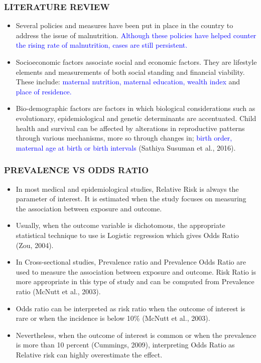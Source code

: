 	\begin{frame}
		\frametitle{LITERATURE REVIEW}
		\begin{itemize}
			\item Several policies and measures have been put in place in the country to address the issue of malnutrition. \textcolor {blue} {Although these policies have helped counter the rising rate of malnutrition, cases are still persistent.} 
			\item Socioeconomic factors associate social and economic factors. They are lifestyle elements and measurements of both social standing and financial viability. These include: \textcolor {blue} {maternal nutrition, maternal education, wealth index} and \textcolor {blue} {place of residence.}
			\item Bio-demographic factors are factors in which biological considerations such as evolutionary, epidemiological and genetic determinants are accentuated. Child health and survival can be affected by alterations in reproductive patterns through various mechanisms, more so through changes in; \textcolor {blue} {birth order, maternal age at birth or birth intervals} (Sathiya Susuman et al., 2016).
		
		\end{itemize}
	\end{frame}

\begin{frame}
	\frametitle{PREVALENCE VS ODDS RATIO}
	\begin{itemize}
		\item In most medical and epidemiological studies, Relative Risk is always the parameter of interest. It is estimated when the study focuses on measuring the association between exposure and outcome.
		\item Usually, when the outcome variable is dichotomous, the appropriate statistical technique to use is Logistic regression which gives Odds Ratio (Zou, 2004). 
		\item In Cross-sectional studies, Prevalence ratio and Prevalence Odds Ratio are used to measure the association between exposure and outcome. Risk Ratio is more appropriate in this type of study and can be computed from Prevalence ratio (McNutt et al., 2003). 
		\item Odds ratio can be interpreted as risk ratio when the outcome of interest is rare or when the incidence is below 10\% (McNutt et al., 2003). 
		\item Nevertheless, when the outcome of interest is common or when the prevalence is more than 10 percent (Cummings, 2009), interpreting Odds Ratio as Relative risk can highly overestimate the effect. 
	\end{itemize}
\end{frame}
